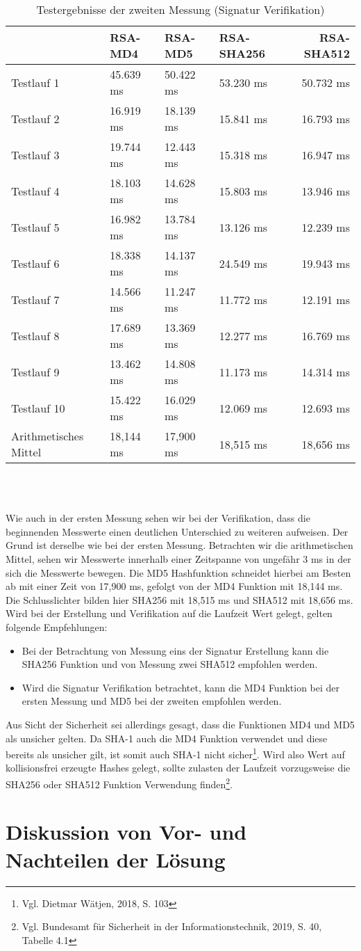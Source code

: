 \begin{table}[h]
	\begin{tabularx}{\textwidth}{p{}|X|X|X|r}
		& RSA-MD4 & RSA-MD5 & RSA-SHA256 & RSA-SHA512\\
		\hline
		Testlauf 1& 45.639 ms& 50.422 ms& 53.230 ms& 50.732 ms\\
		Testlauf 2& 16.919 ms& 18.139 ms& 15.841 ms& 16.793 ms\\
		Testlauf 3& 19.744 ms& 12.443 ms& 15.318 ms& 16.947 ms\\
		Testlauf 4& 18.103 ms& 14.628 ms& 15.803 ms& 13.946 ms\\
		Testlauf 5& 16.982 ms& 13.784 ms& 13.126 ms& 12.239 ms\\
		Testlauf 6& 18.338 ms& 14.137 ms& 24.549 ms& 19.943 ms\\
		Testlauf 7& 14.566 ms& 11.247 ms& 11.772 ms& 12.191 ms\\
		Testlauf 8& 17.689 ms& 13.369 ms& 12.277 ms& 16.769 ms\\
		Testlauf 9& 13.462 ms& 14.808 ms& 11.173 ms& 14.314 ms\\
		Testlauf 10& 15.422 ms& 16.029 ms& 12.069 ms& 12.693 ms\\
		\hline
		Arithmetisches Mittel& 18,144 ms& 17,900 ms& 18,515 ms& 18,656 ms\\
	\end{tabularx}\\
	\caption{Testergebnisse der zweiten Messung (Signatur Verifikation)}
\end{table}\\
Wie auch in der ersten Messung sehen wir bei der Verifikation, dass die beginnenden Messwerte einen deutlichen Unterschied zu weiteren aufweisen. Der Grund ist derselbe wie bei der ersten Messung. Betrachten wir die arithmetischen Mittel, sehen wir Messwerte innerhalb einer Zeitspanne von ungefähr 3 ms in der sich die Messwerte bewegen. Die MD5 Hashfunktion schneidet hierbei am Besten ab mit einer Zeit von 17,900 ms, gefolgt von der MD4 Funktion mit 18,144 ms. Die Schlusslichter bilden hier SHA256 mit 18,515 ms und SHA512 mit 18,656 ms.\\

Wird bei der Erstellung und Verifikation auf die Laufzeit Wert gelegt, gelten folgende Empfehlungen:
\begin{itemize}
	\item Bei der Betrachtung von Messung eins der Signatur Erstellung kann die SHA256 Funktion und von Messung zwei SHA512 empfohlen werden.
	\item Wird die Signatur Verifikation betrachtet, kann die MD4 Funktion bei der ersten Messung und MD5 bei der zweiten empfohlen werden.
\end{itemize}
Aus Sicht der Sicherheit sei allerdings gesagt, dass die Funktionen MD4 und MD5 als unsicher gelten. Da SHA-1 auch die MD4 Funktion verwendet und diese bereits als unsicher gilt, ist somit auch SHA-1 nicht sicher\footnote{Vgl. Dietmar Wätjen, 2018, S. 103}. Wird also Wert auf kollisionsfrei erzeugte Hashes gelegt, sollte zulasten der Laufzeit vorzugsweise die SHA256 oder SHA512 Funktion Verwendung finden\footnote{Vgl. Bundesamt für Sicherheit in der Informationstechnik, 2019, S. 40, Tabelle 4.1}.\\
\section{Diskussion von Vor- und Nachteilen der Lösung}
